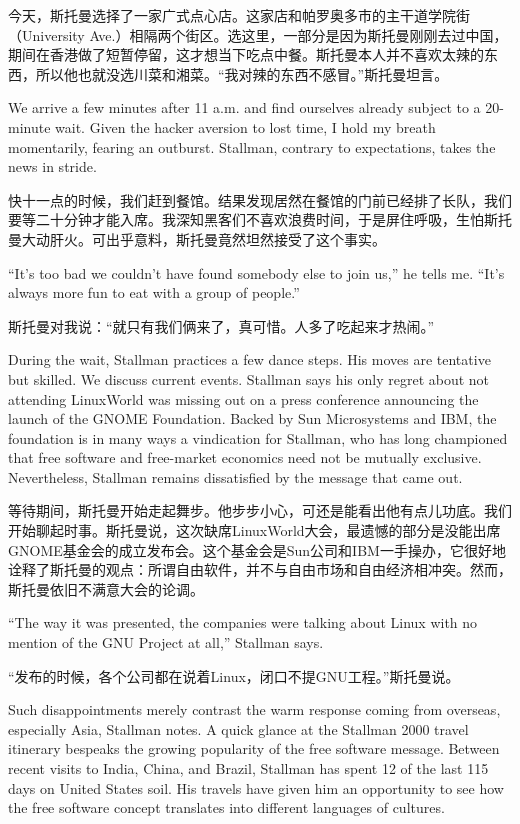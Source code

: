 \ifdefined\chs
今天，斯托曼选择了一家广式点心店。这家店和帕罗奥多市的主干道学院街（University
Ave.）相隔两个街区。选这里，一部分是因为斯托曼刚刚去过中国，期间在香港做了短暂停留，这才想当下吃点中餐。斯托曼本人并不喜欢太辣的东西，所以他也就没选川菜和湘菜。``我对辣的东西不感冒。''斯托曼坦言。
\fi

\ifdefined\eng
We arrive a few minutes after 11 a.m. and find ourselves already subject to a 20-minute wait. Given the hacker aversion to lost time, I hold my breath momentarily, fearing an outburst. Stallman, contrary to expectations, takes the news in stride.
\fi

\ifdefined\chs
快十一点的时候，我们赶到餐馆。结果发现居然在餐馆的门前已经排了长队，我们要等二十分钟才能入席。我深知黑客们不喜欢浪费时间，于是屏住呼吸，生怕斯托曼大动肝火。可出乎意料，斯托曼竟然坦然接受了这个事实。
\fi

\ifdefined\eng
``It's too bad we couldn't have found somebody else to join us,'' he tells me. ``It's always more fun to eat with a group of people.''
\fi

\ifdefined\chs
斯托曼对我说：``就只有我们俩来了，真可惜。人多了吃起来才热闹。''
\fi

\ifdefined\eng
During the wait, Stallman practices a few dance steps. His moves are tentative but skilled. We discuss current events. Stallman says his only regret about not attending LinuxWorld was missing out on a press conference announcing the launch of the GNOME Foundation. Backed by Sun Microsystems and IBM, the foundation is in many ways a vindication for Stallman, who has long championed that free software and free-market economics need not be mutually exclusive. Nevertheless, Stallman remains dissatisfied by the message that came out.
\fi

\ifdefined\chs
等待期间，斯托曼开始走起舞步。他步步小心，可还是能看出他有点儿功底。我们开始聊起时事。斯托曼说，这次缺席LinuxWorld大会，最遗憾的部分是没能出席GNOME基金会的成立发布会。这个基金会是Sun公司和IBM一手操办，它很好地诠释了斯托曼的观点：所谓自由软件，并不与自由市场和自由经济相冲突。然而，斯托曼依旧不满意大会的论调。
\fi

\ifdefined\eng
``The way it was presented, the companies were talking about Linux with no mention of the GNU Project at all,'' Stallman says.
\fi

\ifdefined\chs
``发布的时候，各个公司都在说着Linux，闭口不提GNU工程。''斯托曼说。
\fi

\ifdefined\eng
Such disappointments merely contrast the warm response coming from overseas, especially Asia, Stallman notes. A quick glance at the Stallman 2000 travel itinerary bespeaks the growing popularity of the free software message. Between recent visits to India, China, and Brazil, Stallman has spent 12 of the last 115 days on United States soil. His travels have given him an opportunity to see how the free software concept translates into different languages of cultures.
\fi

